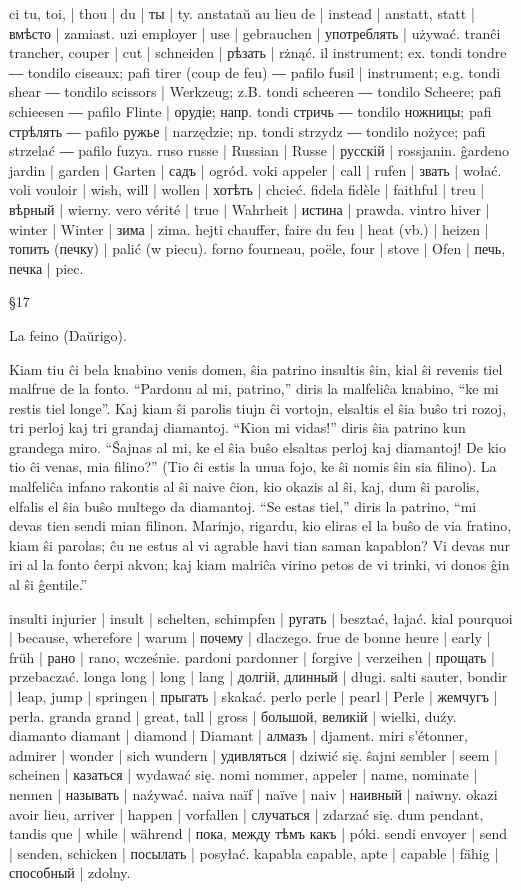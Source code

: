 ci tu, toi, | thou | du | ты | ty.
anstataŭ au lieu de | instead | anstatt, statt | вмѣсто | zamiast.
uzi employer | use | gebrauchen | употреблять | używać.
tranĉi trancher, couper | cut | schneiden | рѣзать | rżnąć.
il instrument; ex. tondi tondre ― tondilo ciseaux; pafi tirer (coup de feu) ― pafilo fusil | instrument; e.g. tondi shear ― tondilo scissors | Werkzeug; z.B. tondi scheeren ― tondilo Scheere; pafi schieesen ― pafilo Flinte | орудіе; напр. tondi стричь ― tondilo ножницы; pafi стрѣлять ― pafilo ружье | narzędzie; np. tondi strzydz ― tondilo nożyce; pafi strzelać ― pafilo fuzya.
ruso russe | Russian | Russe | русскій | rossjanin.
ĝardeno jardin | garden | Garten | садъ | ogród.
voki appeler | call | rufen | звать | wołać.
voli vouloir | wish, will | wollen | хотѣть | chcieć.
fidela fidèle | faithful | treu | вѣрный | wierny.
vero vérité | true | Wahrheit | истина | prawda.
vintro hiver | winter | Winter | зима | zima.
hejti chauffer, faire du feu | heat (vb.) | heizen | топить (печку) | palić (w piecu).
forno fourneau, poële, four | stove | Ofen | печь, печка | piec.

§17

La feino (Daŭrigo).

Kiam tiu ĉi bela knabino venis domen, ŝia patrino insultis ŝin, kial ŝi revenis tiel malfrue de la fonto. “Pardonu al mi, patrino,” diris la malfeliĉa knabino, “ke mi restis tiel longe”. Kaj kiam ŝi parolis tiujn ĉi vortojn, elsaltis el ŝia buŝo tri rozoj, tri perloj kaj tri grandaj diamantoj. “Kion mi vidas!” diris ŝia patrino kun grandega miro. “Ŝajnas al mi, ke el ŝia buŝo elsaltas perloj kaj diamantoj! De kio tio ĉi venas, mia filino?” (Tio ĉi estis la unua fojo, ke ŝi nomis ŝin sia filino). La malfeliĉa infano rakontis al ŝi naive ĉion, kio okazis al ŝi, kaj, dum ŝi parolis, elfalis el ŝia buŝo multego da diamantoj. “Se estas tiel,” diris la patrino, “mi devas tien sendi mian filinon. Marinjo, rigardu, kio eliras el la buŝo de via fratino, kiam ŝi parolas; ĉu ne estus al vi agrable havi tian saman kapablon? Vi devas nur iri al la fonto ĉerpi akvon; kaj kiam malriĉa virino petos de vi trinki, vi donos ĝin al ŝi ĝentile.”

insulti injurier | insult | schelten, schimpfen | ругать | besztać, łajać.
kial pourquoi | because, wherefore | warum | почему | dlaczego.
frue de bonne heure | early | früh | рано | rano, wcześnie.
pardoni pardonner | forgive | verzeihen | прощать | przebaczać.
longa long | long | lang | долгій, длинный | długi.
salti sauter, bondir | leap, jump | springen | прыгать | skakać.
perlo perle | pearl | Perle | жемчугъ | perła.
granda grand | great, tall | gross | большой, великій | wielki, duźy.
diamanto diamant | diamond | Diamant | алмазъ | djament.
miri s’étonner, admirer | wonder | sich wundern | удивляться | dziwić się.
ŝajni sembler | seem | scheinen | казаться | wydawać się.
nomi nommer, appeler | name, nominate | nennen | называть | naźywać.
naiva naïf | naïve | naiv | наивный | naiwny.
okazi avoir lieu, arriver | happen | vorfallen | случаться | zdarzać się.
dum pendant, tandis que | while | während | пока, между тѣмъ какъ | póki.
sendi envoyer | send | senden, schicken | посылать | posyłać.
kapabla capable, apte | capable | fähig | способный | zdolny.

